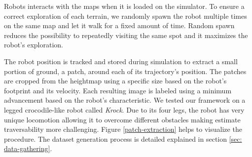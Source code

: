 \documentclass[../document.tex]{subfiles}
\begin{document}
Robots interacts with the maps when it is loaded on the simulator. To ensure a correct exploration of each terrain, we randomly spawn the robot multiple times on the same map and let it walk for a fixed amount of time. Random spawn reduces the possibility to repeatedly visiting the same spot and it maximizes the robot's exploration.

The robot position is tracked and stored during simulation to extract a small portion of ground, a patch, around each of its trajectory's position. The patches are cropped from the heightmap using a specific size based on the robot's footprint and its velocity. Each resulting image is labeled using a minimum advancement based on the robot's characteristic. We tested our framework on a legged crocodile-like robot called \emph{Krock}. Due to its four legs, the robot has very unique locomotion allowing it to overcome different obstacles making estimate traversability more challenging. Figure \ref{patch-extraction} helps to visualize the procedure. The dataset generation process is detailed explained in section \ref{sec: data-gathering}.  
\end{document}
